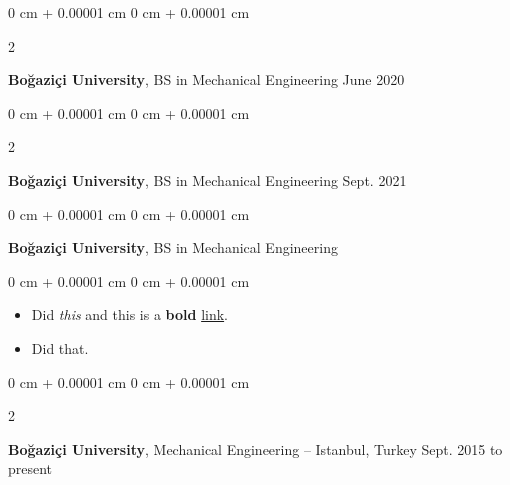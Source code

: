 \documentclass[10pt, letterpaper]{article}
\newenvironment{highlights}{
    \begin{itemize}[
        topsep=0.10 cm,
        parsep=0.10 cm,
        partopsep=0pt,
        itemsep=0pt,
        leftmargin=0 cm + 10pt
    ]
}{
    \end{itemize}
        
    \vspace{-0.10cm}
} %
\newenvironment{onecolentry}{
    \begin{adjustwidth}{
        0 cm + 0.00001 cm
    }{
        0 cm + 0.00001 cm
    }
}{
    \end{adjustwidth}
} %
\newenvironment{twocolentry}[2][]{
    \onecolentry
    \def\secondColumn{#2}
    \setcolumnwidth{\fill, 4.1 cm}
    \begin{paracol}{2}
}{
    \switchcolumn \raggedleft \secondColumn
    \end{paracol}
    \endonecolentry
} %
\begin{document}
        \vspace{0.10 cm}


        \vspace{0.15 cm}

        \begin{twocolentry}{
            June 2020
        }
            \textbf{Boğaziçi University}, BS in Mechanical Engineering\end{twocolentry}

        \vspace{0.10 cm}


        \vspace{0.15 cm}

        \begin{twocolentry}{
            Sept. 2021
        }
            \textbf{Boğaziçi University}, BS in Mechanical Engineering\end{twocolentry}

        \vspace{0.10 cm}


        \vspace{0.15 cm}

        \begin{onecolentry}
            \textbf{Boğaziçi University}, BS in Mechanical Engineering\end{onecolentry}

        \vspace{0.10 cm}
        \begin{onecolentry}
            \begin{highlights}
                \item Did \textit{this} and this is a \textbf{bold} \href{https://example.com}{link}.
                \item Did that.
            \end{highlights}
        \end{onecolentry}


        \vspace{0.15 cm}

        \begin{twocolentry}{
            Sept. 2015 to present
        }
            \textbf{Boğaziçi University}, Mechanical Engineering -- Istanbul, Turkey\end{twocolentry}

        \vspace{0.10 cm}


        \vspace{0.15 cm}
\end{document}
